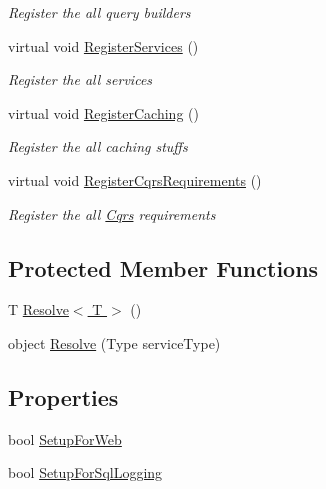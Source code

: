 \begin{DoxyCompactItemize}
\begin{DoxyCompactList}\small\item\em Register the all query builders \end{DoxyCompactList}\item 
virtual void \hyperlink{classCqrs_1_1Ninject_1_1Configuration_1_1CqrsModule_ac6f0db82440e24190a5692d352fb4524}{Register\+Services} ()
\begin{DoxyCompactList}\small\item\em Register the all services \end{DoxyCompactList}\item 
virtual void \hyperlink{classCqrs_1_1Ninject_1_1Configuration_1_1CqrsModule_a6ca61a712ab7efc28eb38e7f74853e3e}{Register\+Caching} ()
\begin{DoxyCompactList}\small\item\em Register the all caching stuffs \end{DoxyCompactList}\item 
virtual void \hyperlink{classCqrs_1_1Ninject_1_1Configuration_1_1CqrsModule_a61a20168f5dc9dab74bb2f7fad7c0adb}{Register\+Cqrs\+Requirements} ()
\begin{DoxyCompactList}\small\item\em Register the all \hyperlink{namespaceCqrs}{Cqrs} requirements \end{DoxyCompactList}\end{DoxyCompactItemize}
\subsection*{Protected Member Functions}
\begin{DoxyCompactItemize}
\item 
T \hyperlink{classCqrs_1_1Ninject_1_1Configuration_1_1CqrsModule_ad1c8eb1a803e84edd7351309f88af177}{Resolve$<$ T $>$} ()
\item 
object \hyperlink{classCqrs_1_1Ninject_1_1Configuration_1_1CqrsModule_ab95600251b5bc727afcb3d22adb032d0}{Resolve} (Type service\+Type)
\end{DoxyCompactItemize}
\subsection*{Properties}
\begin{DoxyCompactItemize}
\item 
bool \hyperlink{classCqrs_1_1Ninject_1_1Configuration_1_1CqrsModule_ae4bbc2d44f283644a328d308dc78edc5}{Setup\+For\+Web}
\item 
bool \hyperlink{classCqrs_1_1Ninject_1_1Configuration_1_1CqrsModule_a10e7a8adbe03fc05ebb7003727cbe541}{Setup\+For\+Sql\+Logging}
\end{DoxyCompactItemize}


